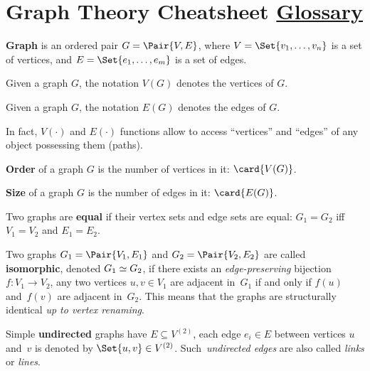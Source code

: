 \documentclass[a4paper,10pt]{article}
\begin{document}

\setcounter{section}{4}%
\section{Graph Theory Cheatsheet%
\texorpdfstring{\normalsize\hfill\href{https://en.wikipedia.org/wiki/Glossary_of_graph_theory}{Glossary}}{}}

\begin{terms}
    \item \textbf{Graph} is an ordered pair $G = \Pair{V, E}$, where $V = \Set{v_1,\dotsc,v_n}$ is a set of vertices, and $E = \Set{e_1,\dotsc,e_m}$ is a set of edges.
    \begin{terms}
        \item Given a graph $G$, the notation $V(G)$ denotes the vertices of $G$.
        \item Given a graph $G$, the notation $E(G)$ denotes the edges of $G$.
        \item In fact, $V({\cdot})$ and $E({\cdot})$ functions allow to access \enquote{vertices} and \enquote{edges} of any object possessing them (\eg paths).
    \end{terms}

    \item \textbf{Order} of a graph $G$ is the number of vertices in it: $\card{V(G)}$.
    \item \textbf{Size} of a graph $G$ is the number of edges in it: $\card{E(G)}$.

    \item Two graphs are \textbf{equal} if their vertex sets and edge sets are equal: $G_1 = G_2$ iff $V_1 = V_2$ and $E_1 = E_2$.

    \item Two graphs $G_1 = \Pair{V_1, E_1}$ and $G_2 = \Pair{V_2, E_2}$ are called \textbf{isomorphic}, denoted $G_1 \simeq G_2$, if there exists an \emph{edge-preserving} bijection $f \colon V_1 \to V_2$, \ie any two vertices $u,v \in V_1$ are adjacent in~$G_1$ if and only if $f(u)$ and~$f(v)$ are adjacent in~$G_2$.
    This means that the graphs are structurally identical \emph{up to vertex renaming}.

    \item Simple \textbf{undirected} graphs have $E \subseteq V^{(2)}$, \ie each edge $e_i \in E$ between vertices $u$ and~$v$ is denoted by $\Set{u,v} \in V^{(2)}$.
    Such~\emph{undirected edges} are also called \emph{links} or \emph{lines}.


\end{terms}
\end{document}

